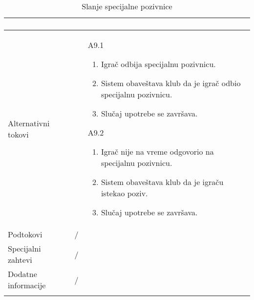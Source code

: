 \documentclass{article}
\begin{document}
\begin{longtable}{| p{} | p{} |}
\begin{enumerate}
    \end{enumerate}\\
\hline
    Alternativni tokovi & \begin{enumerate}
        \item [A9.1] \begin{enumerate}
            \item Igrač odbija specijalnu pozivnicu.
            \item Sistem obaveštava klub da je igrač odbio specijalnu pozivnicu.
            \item Slučaj upotrebe se završava.
        \end{enumerate} 
        \item [A9.2] \begin{enumerate}
            \item Igrač nije na vreme odgovorio na specijalnu pozivnicu.
            \item Sistem obaveštava klub da je igraču istekao poziv.
            \item Slučaj upotrebe se završava.
        \end{enumerate} 
    \end{enumerate}\\
\hline
    Podtokovi & /\\
\hline
    Specijalni zahtevi & /\\
\hline
    Dodatne informacije & / \\
\hline
 
\caption{Slanje specijalne pozivnice} 
\end{longtable}
\end{document}
